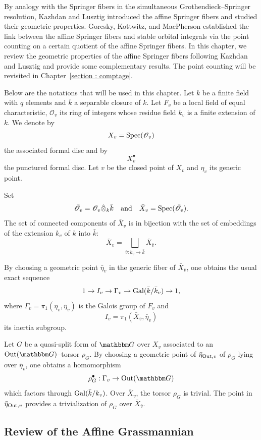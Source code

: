 \documentclass[12pt,english]{smfart}
\numberwithin{equation}{subsection}
\theoremstyle{remark}
\newcommand\calO{{\mathscr O}}
\newcommand\GG{{\mathbbm G}}
\newcommand\Gal{{\rm Gal}}
\newcommand\Spec{{\rm Spec}}
\newcommand\Out{{\rm Out}}
\begin{document}
By analogy with the Springer fibers in the simultaneous Grothendieck--Springer resolution, Kazhdan and Lusztig introduced the affine Springer fibers and studied their geometric properties. Goresky, Kottwitz, and MacPherson established the link between the affine Springer fibers and stable orbital integrals via the point counting on a certain quotient of the affine Springer fibers. In this chapter, we review the geometric properties of the affine Springer fibers following Kazhdan and Lusztig and provide some complementary results. The point counting will be revisited in Chapter~\ref{section : comptage}.

Below are the notations that will be used in this chapter. Let $k$ be a finite field with $q$ elements and $\bar{k}$ a separable closure of $k$. Let $F_v$ be a local field of equal characteristic, $\calO_v$ its ring of integers whose residue field $k_v$ is a finite extension of $k$. We denote by
$$
X_v=\Spec(\calO_v)
$$
the associated formal disc and by
$$
X_v^\bullet
$$
the punctured formal disc. Let $v$ be the closed point of $X_v$ and $\eta_v$ its generic point.

Set 
$$
\bar{\calO}_v=\calO_v\hat\otimes_k \bar{k} \quad \text{and} \quad \bar{X}_v=\Spec(\bar{\calO}_v).
$$
The set of connected components of $\bar{X}_v$ is in bijection with the set of embeddings of the extension $k_v$ of $k$ into $\bar{k}$:
$$
\bar{X}_v=\bigsqcup_{\bar{v}:k_v\rightarrow \bar{k}} \bar{X}_{\bar{v}}.
$$

By choosing a geometric point $\bar{\eta}_v$ in the generic fiber of $\bar{X}_{\bar{v}}$, one obtains the usual exact sequence
$$
1\rightarrow I_v \rightarrow \Gamma_v \rightarrow \Gal(\bar{k}/\bar{k}_v)
\rightarrow 1,
$$
where $\Gamma_v=\pi_1(\eta_v,\bar{\eta}_v)$ is the Galois group of $F_v$ and 
$$
I_v=\pi_1(\bar{X}_{\bar{v}},\bar{\eta}_v)
$$
its inertia subgroup.

Let $G$ be a quasi-split form of $\GG$ over $X_v$ associated to an
$\Out(\GG)$--torsor $\rho_G$. By choosing a geometric point of $\bar{\eta}_{\Out,v}$ of $\rho_G$ lying over $\bar{\eta}_v$, one obtains a homomorphism
$$
\rho_G^\bullet:\Gamma_v\rightarrow \Out(\GG)
$$
which factors through $\Gal(\bar{k}/k_v)$. Over $\bar{X}_v$, the torsor $\rho_G$ is trivial. The point in $\bar{\eta}_{\Out,v}$ provides a trivialization of $\rho_G$ over $\bar{X}_{\bar{v}}$.

\subsection{Review of the Affine Grassmannian}
\label{subsection : grassmannienne affine}
\end{document}
